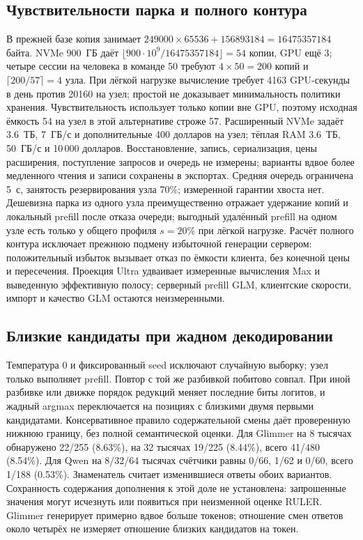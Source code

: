 \subsection{Чувствительности парка и полного контура}
\label{app:engine25-26}
В прежней базе копия занимает $249000\times65536+156893184=16475357184$ байта.
NVMe 900~ГБ даёт $\lfloor900\cdot10^9/16475357184\rfloor=54$ копии, GPU ещё 3;
четыре сессии на человека в команде 50 требуют $4\times50=200$ копий и $\lceil200/57\rceil=4$ узла.
При лёгкой нагрузке вычисление требует 4163 GPU-секунды в день против 20160 на узел;
простой не доказывает минимальность политики хранения.
Чувствительность использует только копии вне GPU, поэтому исходная ёмкость 54 на узел в этой альтернативе строже 57.
Расширенный NVMe задаёт 3.6~ТБ, 7~ГБ/с и дополнительные 400 долларов на узел;
тёплая RAM 3.6~ТБ, 50~ГБ/с и 10\,000 долларов.
Восстановление, запись, сериализация, цены расширения, поступление запросов и очередь не измерены;
варианты вдвое более медленного чтения и записи сохранены в экспортах.
Средняя очередь ограничена 5~с, занятость резервирования узла 70\%; измеренной гарантии хвоста нет.
Дешевизна парка из одного узла преимущественно отражает удержание копий и локальный prefill после отказа очереди;
выгодный удалённый prefill на одном узле есть только у общего профиля $s=20\%$ при лёгкой нагрузке.
Расчёт полного контура исключает прежнюю подмену избыточной генерации сервером:
положительный избыток вызывает отказ по ёмкости клиента, без конечной цены и пересечения.
Проекция Ultra удваивает измеренные вычисления Max и выведенную эффективную полосу;
серверный prefill GLM, клиентские скорости, импорт и качество GLM остаются неизмеренными.


\subsection{Близкие кандидаты при жадном декодировании}
\label{app:near-ties}
Температура 0 и фиксированный seed исключают случайную выборку; узел только выполняет prefill.
Повтор с той же разбивкой побитово совпал. При иной разбивке или движке порядок редукций меняет
последние биты логитов, и жадный argmax переключается на позициях с близкими двумя первыми кандидатами.
Консервативное правило содержательной смены даёт проверенную нижнюю границу, без полной семантической оценки.
Для Glimmer на 8 тысячах обнаружено 22/255 (8.63\%), на 32 тысячах 19/225 (8.44\%), всего 41/480 (8.54\%).
Для Qwen на 8/32/64 тысячах счётчики равны 0/66, 1/62 и 0/60, всего 1/188 (0.53\%).
Знаменатель считает изменившиеся ответы обоих вариантов. Сохранность содержания дополнения к этой доле не установлена:
запрошенные значения могут исчезнуть или появиться при неизменной оценке RULER.
Glimmer генерирует примерно вдвое больше токенов; отношение смен ответов около четырёх
не измеряет отношение близких кандидатов на токен.

